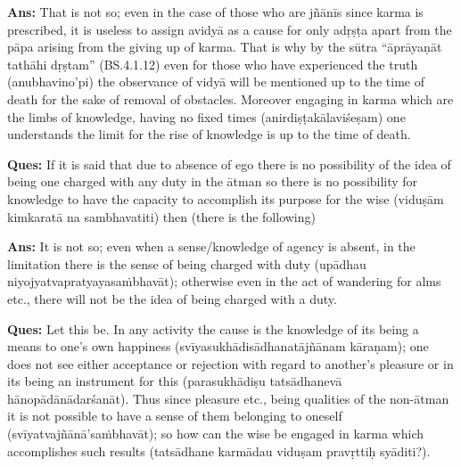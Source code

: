 \textbf{Ans:} That is not so; even in the case of those who are jñānīs since karma is prescribed, it is useless to assign avidyā as a cause for only adṛṣṭa apart from the pāpa arising from the giving up of karma. That is why by the sūtra “āprāyaṇāt tathāhi dṛṣtam” (BS.4.1.12) even for those who have experienced the truth (anubhavino’pi) the observance of vidyā will be mentioned up to the time of death for the sake of removal of obstacles. Moreover engaging in karma which are the limbs of knowledge, having no fixed times (anirdiṣṭakālaviśeṣam) one understands the limit for the rise of knowledge is up to the time of death. 



\textbf{Ques:} If it is said that due to absence of ego there is no possibility of the idea of being one charged with any duty in the ātman so there is no possibility for knowledge  to have the capacity to accomplish its purpose for the wise (viduṣām kimkaratā na sambhavatiti) then (there is the following)

\textbf{Ans:} It is not so; even when a sense/knowledge of agency is absent,  in the limitation there is the sense of being charged with duty (upādhau niyojyatvapratyayasaṁbhavāt); otherwise even in the act of wandering for alms etc., there will not be the idea of being charged with a duty.

\textbf{Ques:} Let this be. In any activity the cause is the knowledge of its being a means to one’s own happiness (svīyasukhādisādhanatājñānam kāraṇam); one does not see either acceptance or rejection with regard to another’s pleasure or in its being an instrument for this (parasukhādiṣu tatsādhanevā hānopādānādarśanāt). Thus since pleasure etc., being qualities of the non-ātman it is not possible to have a sense of them belonging to oneself (svīyatvajñānā’saṁbhavāt); so how can the wise be engaged in karma which accomplishes such results (tatsādhane karmādau viduṣam pravṛttiḥ syāditi?).

